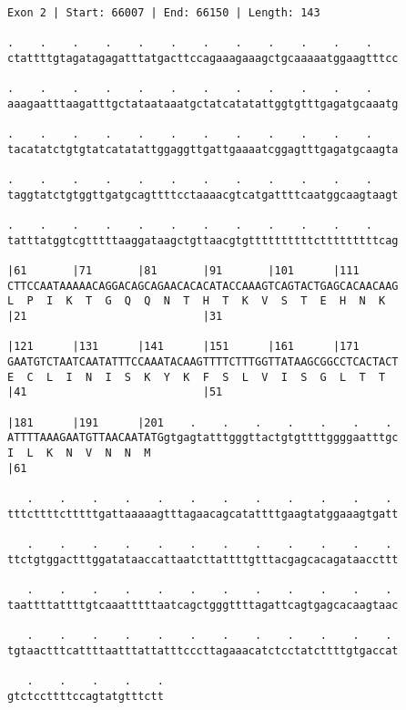 \documentclass{article}
\begin{document}
\begin{Verbatim}[fontfamily=courier]
Exon 2 | Start: 66007 | End: 66150 | Length: 143

.    .    .    .    .    .    .    .    .    .    .    .    
ctattttgtagatagagatttatgacttccagaaagaaagctgcaaaaatggaagtttcc

.    .    .    .    .    .    .    .    .    .    .    .    
aaagaatttaagatttgctataataaatgctatcatatattggtgtttgagatgcaaatg

.    .    .    .    .    .    .    .    .    .    .    .    
tacatatctgtgtatcatatattggaggttgattgaaaatcggagtttgagatgcaagta

.    .    .    .    .    .    .    .    .    .    .    .    
taggtatctgtggttgatgcagttttcctaaaacgtcatgattttcaatggcaagtaagt

.    .    .    .    .    .    .    .    .    .    .    .    
tatttatggtcgtttttaaggataagctgttaacgtgttttttttttctttttttttcag

|61       |71       |81       |91       |101      |111      
CTTCCAATAAAAACAGGACAGCAGAACACACATACCAAAGTCAGTACTGAGCACAACAAG
L  P  I  K  T  G  Q  Q  N  T  H  T  K  V  S  T  E  H  N  K  
|21                           |31                           

|121      |131      |141      |151      |161      |171      
GAATGTCTAATCAATATTTCCAAATACAAGTTTTCTTTGGTTATAAGCGGCCTCACTACT
E  C  L  I  N  I  S  K  Y  K  F  S  L  V  I  S  G  L  T  T  
|41                           |51                           

|181      |191      |201    .    .    .    .    .    .    . 
ATTTTAAAGAATGTTAACAATATGgtgagtatttgggttactgtgttttggggaatttgc
I  L  K  N  V  N  N  M                                      
|61                                                         

   .    .    .    .    .    .    .    .    .    .    .    . 
tttcttttctttttgattaaaaagtttagaacagcatattttgaagtatggaaagtgatt

   .    .    .    .    .    .    .    .    .    .    .    . 
ttctgtggactttggatataaccattaatcttattttgtttacgagcacagataaccttt

   .    .    .    .    .    .    .    .    .    .    .    . 
taattttattttgtcaaatttttaatcagctgggttttagattcagtgagcacaagtaac

   .    .    .    .    .    .    .    .    .    .    .    . 
tgtaactttcattttaatttattatttcccttagaaacatctcctatcttttgtgaccat

   .    .    .    .    .
gtctccttttccagtatgtttctt
\end{Verbatim}
\newpage
\end{document}
